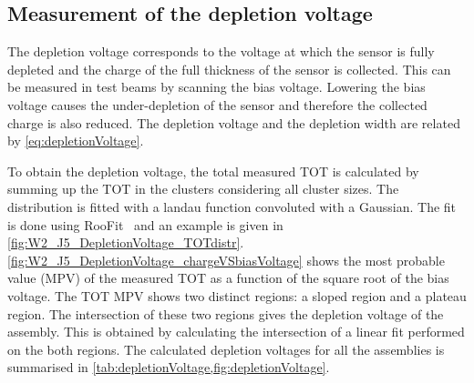 \subsection{Measurement of the depletion voltage}
\label{sec:ThinSensors_depletionVoltage}

The depletion voltage corresponds to the voltage at which the sensor
is fully depleted and the charge of the full thickness of the sensor
is collected. This can be measured in test beams by scanning the bias
voltage. Lowering the bias voltage causes the under-depletion of the
sensor and therefore the collected charge is also reduced. The
depletion voltage and the depletion width are related by
\cref{eq:depletionVoltage}.

To obtain the depletion voltage, the total measured TOT is calculated
by summing up the TOT in the clusters considering all cluster
sizes. The distribution is fitted with a landau function convoluted
with a Gaussian. The fit is done using RooFit~\cite{Cranmer:2012sba}
and an example is given in \cref{fig:W2_J5_DepletionVoltage_TOTdistr}.
\cref{fig:W2_J5_DepletionVoltage_chargeVSbiasVoltage} shows the most
probable value (MPV) of the measured TOT as a function of the square
root of the bias voltage. The TOT MPV shows two distinct regions: a
sloped region and a plateau region. The intersection of these two
regions gives the depletion voltage of the assembly. This is obtained
by calculating the intersection of a linear fit performed on the both
regions. The calculated depletion voltages for all the assemblies is
summarised in \cref{tab:depletionVoltage,fig:depletionVoltage}.

